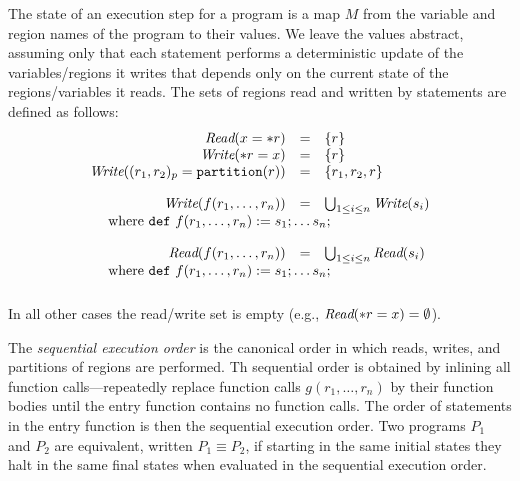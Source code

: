The state of an execution step for a program is a map $M$ from the
variable and region names of the program to their values.  We leave the values
abstract, assuming only that each statement performs a deterministic
update of the variables/regions it writes that depends only on the
current state of the regions/variables it reads.
The sets of regions read and written by statements are defined as follows:
\[
\begin{array}{rcl}
\rread{x = \deref r} & = & \{ r \} \\
\rwrite{\deref r = x} & = & \{ r \} \\
\rwrite{(r_1, r_2)_{p} = \mbox{\tt partition}(r)} & = & \{ r_1,r_2,r \} \\[.15in]
\rwrite{f(r_1,\ldots,r_n)} & = & \bigcup_{1 \leq i \leq n}{\rwrite{s_i}} \\
\multicolumn{3}{l}{\ \ \ \ \mbox{where\ {\tt def}}\ f(r_1,\ldots,r_n): =   s_1; \ldots s_n;} \\[.15in]
\rread{f(r_1,\ldots,r_n)} & = & \bigcup_{1 \leq i \leq n}{\rread{s_i}} \\
\multicolumn{3}{l}{\ \ \ \ \mbox{where\ {\tt def}}\ f(r_1,\ldots,r_n): =   s_1; \ldots s_n;} \\[.15in]
\end{array}
\]
In all other cases the read/write set is empty (e.g., $\mbox{\em Read}(\ast r = x) = \emptyset$).

The {\em sequential execution order} is the canonical order in which reads, writes, and partitions of regions are performed.
Th sequential order is obtained by inlining all function calls---repeatedly
replace function calls $g(r_1,\ldots,r_n)$ by their function bodies until the entry function contains no function calls.
The order of statements in the entry function is then the sequential execution order. 
Two programs $P_1$ and $P_2$ are equivalent, written $P_1 \equiv P_2$, if starting in the same initial states they halt in
the same final states when evaluated in the sequential execution order.

